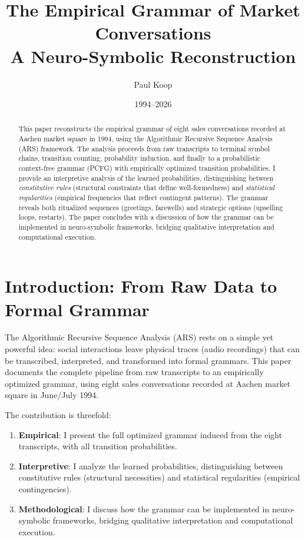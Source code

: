 \documentclass[12pt,a4paper]{article}
\title{\Huge\textbf{The Empirical Grammar of Market Conversations} \\[2mm]
       \LARGE A Neuro-Symbolic Reconstruction}
\author{
  \large
  \begin{tabular}{c}
    Paul Koop
  \end{tabular}
}
\date{\large 1994--2026}
\begin{document}
\maketitle

\begin{abstract}
This paper reconstructs the empirical grammar of eight sales conversations recorded
at Aachen market square in 1994, using the Algorithmic Recursive Sequence Analysis
(ARS) framework. The analysis proceeds from raw transcripts to terminal symbol
chains, transition counting, probability induction, and finally to a probabilistic
context-free grammar (PCFG) with empirically optimized transition probabilities.
I provide an interpretive analysis of the learned probabilities, distinguishing
between \textit{constitutive rules} (structural constraints that define well-formedness)
and \textit{statistical regularities} (empirical frequencies that reflect contingent
patterns). The grammar reveals both ritualized sequences (greetings, farewells)
and strategic options (upselling loops, restarts). The paper concludes with a
discussion of how the grammar can be implemented in neuro-symbolic frameworks,
bridging qualitative interpretation and computational execution.
\end{abstract}

\newpage
\tableofcontents
\newpage

\section{Introduction: From Raw Data to Formal Grammar}

The Algorithmic Recursive Sequence Analysis (ARS) rests on a simple yet powerful
idea: social interactions leave physical traces (audio recordings) that can be
transcribed, interpreted, and transformed into formal grammars. This paper
documents the complete pipeline from raw transcripts to an empirically optimized
grammar, using eight sales conversations recorded at Aachen market square in
June/July 1994.

The contribution is threefold:

\begin{enumerate}
    \item \textbf{Empirical}: I present the full optimized grammar induced from
    the eight transcripts, with all transition probabilities.
    
    \item \textbf{Interpretive}: I analyze the learned probabilities, distinguishing
    between constitutive rules (structural necessities) and statistical regularities
    (empirical contingencies).
    
    \item \textbf{Methodological}: I discuss how the grammar can be implemented
    in neuro-symbolic frameworks, bridging qualitative interpretation and
    computational execution.
\end{enumerate}
\end{document}
